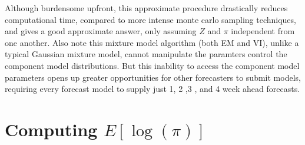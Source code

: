 \documentclass[12pt]{article}
\def\l{\left}
\def\r{\right}
\begin{document}
Although burdensome upfront, this approximate procedure drastically reduces computational time, compared to more intense monte carlo sampling techniques, and gives a good approximate answer, only assuming $Z$ and $\pi$ independent from one another.
Also note this mixture model algorithm (both EM and VI), unlike a typical Gaussian mixture model, cannot manipulate the paramters control the component model distributions.
But this inability to access the component model parameters opens up greater opportunities for other forecasters to submit models, requiring every forecast model to supply just 1, 2 ,3 , and 4 week ahead forecasts.

\section{Computing $E\l[\log(\pi)\r]$}
\label{app.expec}
\end{document}
